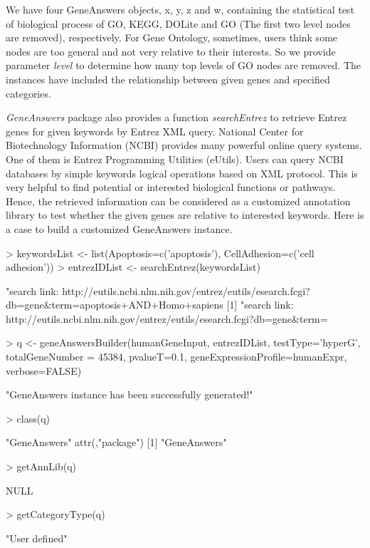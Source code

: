 \documentclass[a4paper]{article}
\newcommand{\Rpackage}[1]{{\textit{#1}}}
\begin{document}
We have four GeneAnswers objects, x, y, z and w, containing the statistical test of biological process of GO, KEGG, DOLite and GO (The first two level nodes are removed), respectively. For Gene Ontology, sometimes, users think some nodes are too general and not very relative to their interests. So we provide parameter {\it level} to determine how many top levels of GO nodes are removed. The instances have included the relationship between given genes and specified categories.

\Rpackage{GeneAnswers} package also provides a function {\it searchEntrez} to retrieve Entrez genes for given keywords by Entrez XML query. National Center for Biotechnology Information (NCBI) provides many powerful online query systems. One of them is Entrez Programming Utilities (eUtils). Users can query NCBI databases by simple keywords logical operations based on XML protocol. This is very helpful to find potential or interested biological functions or pathways. Hence, the retrieved information can be considered as a customized annotation library to test whether the given genes are relative to interested keywords. Here is a case to build a customized GeneAnswers instance.
\begin{Schunk}
\begin{Sinput}
> keywordsList <- list(Apoptosis=c('apoptosis'), CellAdhesion=c('cell adhesion'))
> entrezIDList <- searchEntrez(keywordsList) 
\end{Sinput}
\begin{Soutput}
[1] "search link: http://eutils.ncbi.nlm.nih.gov/entrez/eutils/esearch.fcgi?db=gene&term=apoptosis+AND+Homo+sapiens%
[1] "search link: http://eutils.ncbi.nlm.nih.gov/entrez/eutils/esearch.fcgi?db=gene&term=%
\end{Soutput}
\begin{Sinput}
> q <- geneAnswersBuilder(humanGeneInput, entrezIDList, testType='hyperG', totalGeneNumber = 45384, pvalueT=0.1, geneExpressionProfile=humanExpr, verbose=FALSE)
\end{Sinput}
\begin{Soutput}
[1] "GeneAnswers instance has been successfully generated!"
\end{Soutput}
\begin{Sinput}
> class(q)
\end{Sinput}
\begin{Soutput}
[1] "GeneAnswers"
attr(,"package")
[1] "GeneAnswers"
\end{Soutput}
\begin{Sinput}
> getAnnLib(q)
\end{Sinput}
\begin{Soutput}
NULL
\end{Soutput}
\begin{Sinput}
> getCategoryType(q)
\end{Sinput}
\begin{Soutput}
[1] "User defined"
\end{Soutput}
\end{Schunk}
\end{document}
